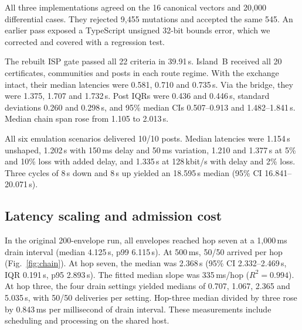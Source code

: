 \documentclass[conference,a4paper,10pt]{IEEEtran}
\begin{document}
All three implementations agreed on the 16 canonical vectors and 20,000 differential cases. They rejected 9,455 mutations and accepted the same 545. An earlier pass exposed a TypeScript unsigned 32-bit bounds error, which we corrected and covered with a regression test.

The rebuilt ISP gate passed all 22 criteria in 39.91\,s. Island~B received all 20 certificates, communities and posts in each route regime. With the exchange intact, their median latencies were 0.581, 0.710 and 0.735\,s. Via the bridge, they were 1.375, 1.707 and 1.732\,s. Post IQRs were 0.436 and 0.446\,s, standard deviations 0.260 and 0.298\,s, and 95\% median CIs 0.507--0.913 and 1.482--1.841\,s. Median chain span rose from 1.105 to 2.013\,s.

All six emulation scenarios delivered 10/10 posts. Median latencies were 1.154\,s unshaped, 1.202\,s with 150\,ms delay and 50\,ms variation, 1.210 and 1.377\,s at 5\% and 10\% loss with added delay, and 1.335\,s at 128\,kbit/s with delay and 2\% loss. Three cycles of 8\,s down and 8\,s up yielded an 18.595\,s median (95\% CI 16.841--20.071\,s).

\subsection{Latency scaling and admission cost}

In the original 200-envelope run, all envelopes reached hop seven at a 1{,}000\,ms drain interval (median 4.125\,s, p99 6.115\,s). At 500\,ms, 50/50 arrived per hop (Fig.~\ref{fig:chain}). At hop seven, the median was 2.368\,s (95\% CI 2.332--2.469\,s, IQR 0.191\,s, p95 2.893\,s). The fitted median slope was 335\,ms/hop ($R^2=0.994$). At hop three, the four drain settings yielded medians of 0.707, 1.067, 2.365 and 5.035\,s, with 50/50 deliveries per setting. Hop-three median divided by three rose by 0.843\,ms per millisecond of drain interval. These measurements include scheduling and processing on the shared host.
\end{document}
